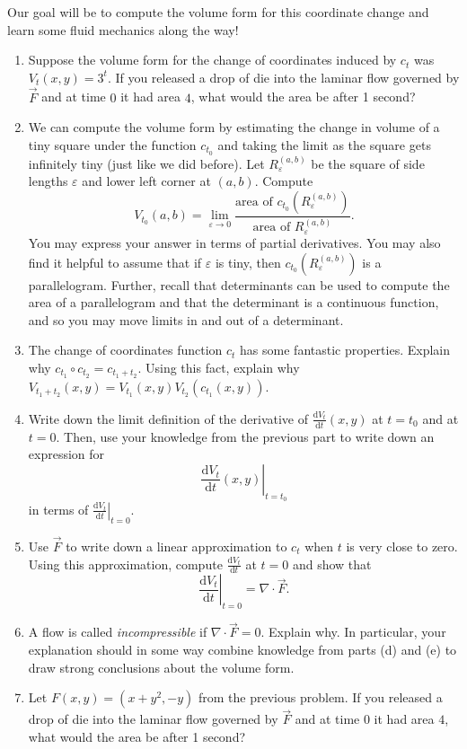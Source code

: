 \documentclass[letter]{article}
\renewcommand{\d}{\mathrm{d}}
\begin{document}
\begin{enumerate}
			Our goal will be to compute the volume form for this coordinate change and learn some fluid mechanics
			along the way!
			\begin{enumerate}
				\item Suppose the volume form for the change of coordinates induced by $c_t$ was $V_t(x,y)=3^{t}$.
					If you released a drop of die into the laminar flow governed by $\vec F$ and
					at time $0$ it had area $4$, what would the area be after 1 second?
				\item We can compute the volume form by estimating the change in volume of a tiny square
					under the function $c_{t_0}$ and taking the limit as the square gets infinitely
					tiny (just like we did before).  Let $R_{\varepsilon}^{(a,b)}$ be the square
					of side lengths $\varepsilon$ and lower left corner at $(a,b)$.  Compute
					\[
						V_{t_0}(a,b)=\lim_{\varepsilon\to 0}\frac{\text{area of }c_{t_0}(R_{\varepsilon}^{(a,b)})}{
						\text{area of }R_{\varepsilon}^{(a,b)}}.
					\]
					You may express your answer in terms of partial derivatives.  You may also
					find it helpful to assume that if $\varepsilon$ is tiny, then
					$c_{t_0}(R_{\varepsilon}^{(a,b)})$ is a parallelogram.  Further, recall that determinants
					can be used to compute the area of a parallelogram and that the determinant is
					a continuous function, and so you may move limits in and out of a determinant.
				\item The change of coordinates function $c_t$ has some fantastic properties.  Explain
					why $c_{t_1}\circ c_{t_2} = c_{t_1+t_2}$.  Using this fact, explain why 
					$V_{t_1+t_2}(x,y)=V_{t_1}(x,y)V_{t_2}(c_{t_1}(x,y))$.
				\item Write down the limit definition of the derivative of $\displaystyle\frac{\d V_t}{\d t}(x,y)$ at $t=t_0$
					and at $t=0$.
					Then, use your knowledge from the previous part to write down an expression for
					\[
						\left. \frac{\d V_t}{\d t}(x,y)\right|_{t=t_0}
					\]
					in terms of $\left. \frac{\d V_t}{\d t}\right|_{t=0}$.
				\item Use $\vec F$ to write down a linear approximation to $c_{t}$ when $t$ is very close
					to zero. Using this approximation, compute $\displaystyle \frac{\d V_t}{\d t}$ at $t=0$
					and
					show that
					\[
						\left. \frac{\d V_t}{\d t}\right|_{t=0}=\nabla \cdot \vec F.
					\]
				\item A flow is called \emph{incompressible} if $\nabla \cdot \vec F=0$.  Explain why.
					In particular, your explanation should in some way combine knowledge from
					parts (d) and (e) to draw strong conclusions about the volume form.
				\item Let $F(x,y) = (x+y^2,-y)$ from the previous problem.
					If you released a drop of die into the laminar flow governed by $\vec F$ and
					at time $0$ it had area $4$, what would the area be after 1 second?

			\end{enumerate}
	\end{enumerate}
\end{document}
